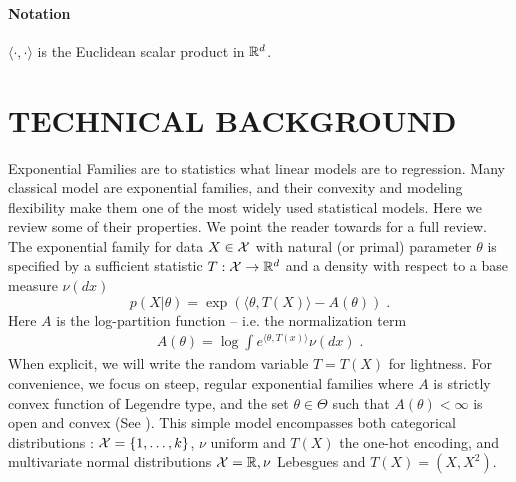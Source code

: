 \documentclass[twoside]{article}
\let\oldsection\section
\renewcommand{\section}[1]{\oldsection{\texorpdfstring{\uppercase{#1}}{#1}}}
\newcommand{\logpart}{A}
\newcommand{\nat}{\theta}
\begin{document}
\paragraph{Notation}
$\langle \cdot , \cdot \rangle$ is the Euclidean scalar product in $\mathbb{R}^d$.

\section{Technical background}

Exponential Families are to statistics what linear models are to regression.
Many classical model are exponential families, and their convexity and modeling flexibility make them one of the most widely used statistical models.
Here we review some of their properties.
We point the reader towards \citet[Chapter 3]{wainwright2008graphical} for a full review.
The exponential family for data $X\in {\mathcal X}$ with natural (or primal) parameter $\nat$  is specified by a sufficient statistic $T: {\mathcal X} \rightarrow \mathbb{R}^d$ and a density with respect to a base measure $\nu(dx)$
\begin{equation}
	 p(X|\nat) = \exp( \langle \nat, T(X) \rangle - \logpart(\nat)) \; .
	 \label{eq:def_expfamily}
\end{equation}
Here $\logpart$ is the log-partition function -- i.e. the normalization term
\begin{align}
    \logpart(\nat) = \log \int e^{\langle \nat, T(x) \rangle} \nu(dx) \; .
\end{align}
When explicit, we will write the random variable $T = T(X)$ for lightness.
For convenience, we focus on steep, regular exponential families
where $\logpart$ is strictly convex function of Legendre type,
and the set $\nat \in \Theta$ such that $\logpart(\nat) < \infty$ is open and convex
(See \citet{barndoffnielsen2014information}).
This simple model encompasses both categorical distributions : ${\mathcal X} = \{1, \dots, k\}$, $\nu$ uniform and $T(X)$  the one-hot encoding, and multivariate normal distributions ${\mathcal X}=\mathbb{R}, \nu$ Lebesgues and $T(X)=(X, X^2)$.

\end{document}
